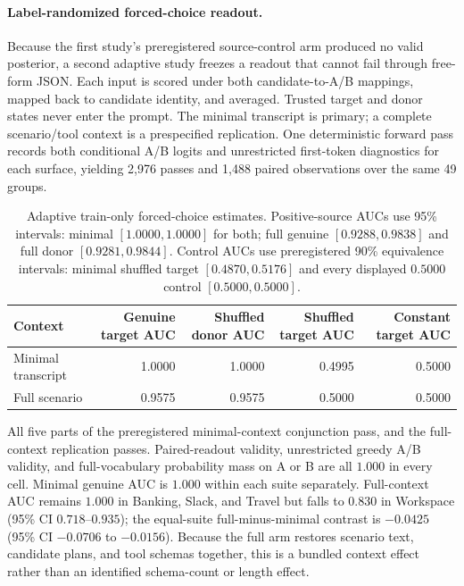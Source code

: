 \documentclass[10pt]{article}
\begin{document}
\paragraph{Label-randomized forced-choice readout.}
Because the first study's preregistered source-control arm produced no valid posterior, a second adaptive study freezes a readout that cannot fail through free-form JSON. Each input is scored under both candidate-to-A/B mappings, mapped back to candidate identity, and averaged. Trusted target and donor states never enter the prompt. The minimal transcript is primary; a complete scenario/tool context is a prespecified replication. One deterministic forward pass records both conditional A/B logits and unrestricted first-token diagnostics for each surface, yielding 2,976 passes and 1,488 paired observations over the same 49 groups.

\begin{table}[t]
\centering
\scriptsize
\begin{tabular}{@{}lrrrr@{}}
\toprule
\textbf{Context} & \textbf{Genuine target AUC} & \textbf{Shuffled donor AUC} & \textbf{Shuffled target AUC} & \textbf{Constant target AUC} \\
\midrule
Minimal transcript & 1.0000 & 1.0000 & 0.4995 & 0.5000 \\
Full scenario & 0.9575 & 0.9575 & 0.5000 & 0.5000 \\
\bottomrule
\end{tabular}
\caption{Adaptive train-only forced-choice estimates. Positive-source AUCs use 95\% intervals: minimal $[1.0000,1.0000]$ for both; full genuine $[0.9288,0.9838]$ and full donor $[0.9281,0.9844]$. Control AUCs use preregistered 90\% equivalence intervals: minimal shuffled target $[0.4870,0.5176]$ and every displayed $0.5000$ control $[0.5000,0.5000]$.}
\label{tab:forcedchoice}
\end{table}

All five parts of the preregistered minimal-context conjunction pass, and the full-context replication passes. Paired-readout validity, unrestricted greedy A/B validity, and full-vocabulary probability mass on A or B are all $1.000$ in every cell. Minimal genuine AUC is $1.000$ within each suite separately. Full-context AUC remains $1.000$ in Banking, Slack, and Travel but falls to $0.830$ in Workspace (95\% CI $0.718$--$0.935$); the equal-suite full-minus-minimal contrast is $-0.0425$ (95\% CI $-0.0706$ to $-0.0156$). Because the full arm restores scenario text, candidate plans, and tool schemas together, this is a bundled context effect rather than an identified schema-count or length effect.
\end{document}
